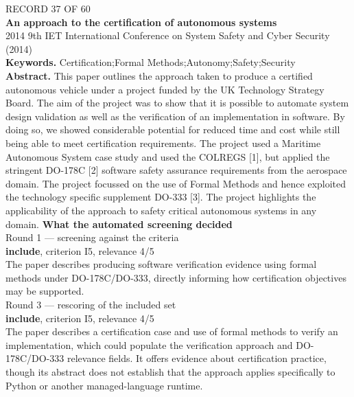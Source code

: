 \documentclass[11pt,a4paper]{article}
\begin{document}
\clearpage
{\color{soft}\footnotesize RECORD 37 OF 60}\\[1mm]
{\large\bfseries An approach to the certification of autonomous systems}\\[1.5mm]
{\color{soft}\small 2014 \textperiodcentered{} 9th IET International Conference on System Safety and Cyber Security (2014)}\\[2mm]
{\small\textbf{Keywords.} Certification;Formal Methods;Autonomy;Safety;Security}\\[2mm]
{\small\textbf{Abstract.} This paper outlines the approach taken to produce a certified autonomous vehicle under a project funded by the UK Technology Strategy Board. The aim of the project was to show that it is possible to automate system design validation as well as the verification of an implementation in software. By doing so, we showed considerable potential for reduced time and cost while still being able to meet certification requirements. The project used a Maritime Autonomous System case study and used the COLREGS [1], but applied the stringent DO-178C [2] software safety assurance requirements from the aerospace domain. The project focussed on the use of Formal Methods and hence exploited the technology specific supplement DO-333 [3]. The project highlights the applicability of the approach to safety critical autonomous systems in any domain.}
\vspace{3mm}
\vspace{2.5mm}
{\small\textbf{What the automated screening decided}}\\[2mm]
{\footnotesize\color{soft}Round 1 --- screening against the criteria}\\[0.5mm]
{\small\textbf{include}, criterion I5, relevance 4/5}\\[0.5mm]
{\small The paper describes producing software verification evidence using formal methods under DO-178C/DO-333, directly informing how certification objectives may be supported.}\\[2.5mm]
{\footnotesize\color{soft}Round 3 --- rescoring of the included set}\\[0.5mm]
{\small\textbf{include}, criterion I5, relevance 4/5}\\[0.5mm]
{\small The paper describes a certification case and use of formal methods to verify an implementation, which could populate the verification approach and DO-178C/DO-333 relevance fields. It offers evidence about certification practice, though its abstract does not establish that the approach applies specifically to Python or another managed-language runtime.}\\[2.5mm]
\end{document}
